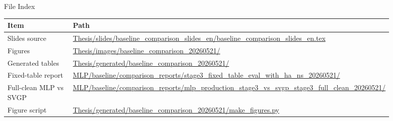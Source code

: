 \documentclass[aspectratio=169,11pt]{beamer}
\newcommand{\pathtext}[1]{{\scriptsize\url{#1}}}
\begin{document}
\begin{frame}{File Index}
\small
\begin{tabular}{L{0.30\linewidth}L{0.60\linewidth}}
\toprule
Item & Path \\
\midrule
Slides source & \pathtext{Thesis/slides/baseline_comparison_slides_en/baseline_comparison_slides_en.tex} \\
Figures & \pathtext{Thesis/images/baseline_comparison_20260521/} \\
Generated tables & \pathtext{Thesis/generated/baseline_comparison_20260521/} \\
Fixed-table report & \pathtext{MLP/baseline/comparison_reports/stage3_fixed_table_eval_with_ha_ns_20260521/} \\
Full-clean MLP vs SVGP & \pathtext{MLP/baseline/comparison_reports/mlp_production_stage3_vs_svgp_stage3_full_clean_20260521/} \\
Figure script & \pathtext{Thesis/generated/baseline_comparison_20260521/make_figures.py} \\
\bottomrule
\end{tabular}
\end{frame}
\end{document}
